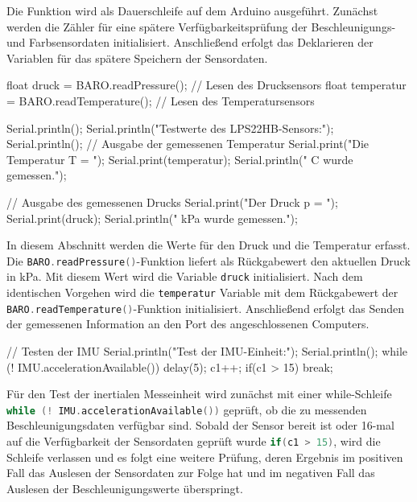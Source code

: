 Die Funktion  wird als Dauerschleife auf dem Arduino ausgeführt. Zunächst werden die Zähler für eine spätere Verfügbarkeitsprüfung der Beschleunigungs- und Farbsensordaten initialisiert. Anschließend erfolgt das Deklarieren der Variablen für das spätere Speichern der Sensordaten.
	
	\begin{Arduino}
	float druck = BARO.readPressure();        // Lesen des Drucksensors
	float temperatur = BARO.readTemperature();  // Lesen des Temperatursensors
	
	Serial.println();
	Serial.println("Testwerte des LPS22HB-Sensors:");
	Serial.println();
	// Ausgabe der gemessenen Temperatur
	Serial.print("Die Temperatur T = ");
	Serial.print(temperatur);
	Serial.println(" C wurde gemessen.");
	
	// Ausgabe des gemessenen Drucks
	Serial.print("Der Druck p = ");
	Serial.print(druck);
	Serial.println(" kPa wurde gemessen.");
	\end{Arduino}
	
	In diesem Abschnitt werden die Werte für den Druck und die Temperatur erfasst. Die \lstinline[language=C++]|BARO.readPressure()|-Funktion liefert als Rückgabewert den aktuellen Druck in kPa. Mit diesem Wert wird die Variable \lstinline[language=C++]|druck| initialisiert. Nach dem identischen Vorgehen wird die \lstinline[language=C++]|temperatur| Variable mit dem Rückgabewert der \lstinline[language=C++]|BARO.readTemperature()|-Funktion initialisiert. Anschließend erfolgt das Senden der gemessenen Information an den Port des angeschlossenen Computers.
	
	\begin{Arduino}
		// Testen der IMU
		Serial.println("Test der IMU-Einheit:");
		Serial.println();
		while (! IMU.accelerationAvailable()) {
			delay(5);
			c1++;
			if(c1 > 15)
			{
				break;
			}
		}
	\end{Arduino}
	
	Für den Test der inertialen Messeinheit wird zunächst mit einer while-Schleife \lstinline[language=C++]|while (! IMU.accelerationAvailable())| geprüft, ob die zu messenden Beschleunigungsdaten verfügbar sind. Sobald der Sensor bereit ist oder 16-mal auf die Verfügbarkeit der Sensordaten geprüft wurde \lstinline[language=C++]|if(c1 > 15)|, wird die Schleife verlassen und es folgt eine weitere Prüfung, deren Ergebnis im positiven Fall das Auslesen der Sensordaten zur Folge hat und im negativen Fall das Auslesen der Beschleunigungswerte überspringt.
	
